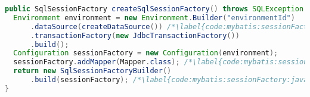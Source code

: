 
\begin{lstlisting}[language=Java, caption={Configuration of \Code{SqlSessionFactory} in Java}, label={code:mybatis:sessionFactory:java}]
public SqlSessionFactory createSqlSessionFactory() throws SQLException {
  Environment environment = new Environment.Builder("environmentId")
      .dataSource(createDataSource()) /*\label{code:mybatis:sessionFactory:java:dataSource}*/
      .transactionFactory(new JdbcTransactionFactory())
      .build();
  Configuration sessionFactory = new Configuration(environment);
  sessionFactory.addMapper(Mapper.class); /*\label{code:mybatis:sessionFactory:java:addMapper}*/
  return new SqlSessionFactoryBuilder()
      .build(sessionFactory); /*\label{code:mybatis:sessionFactory:java:sessionFactory}*/
}
\end{lstlisting}
